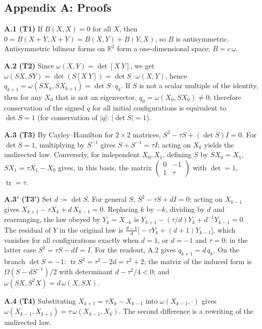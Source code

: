 \documentclass[
  a4paper,
]{article}
\begin{document}
\subsection{Appendix A: Proofs}\label{appendix-a-proofs}

\textbf{A.1 (T1)} If \(B(X,X)=0\) for all \(X\), then
\(0=B(X+Y,X+Y)=B(X,Y)+B(Y,X)\), so \(B\) is antisymmetric. Antisymmetric
bilinear forms on \(\mathbb R^2\) form a one-dimensional space:
\(B=c\,\omega\).

\textbf{A.2 (T2)} Since \(\omega(X,Y)=\det[X\ Y]\), we get
\(\omega(SX,SY)=\det(S[X\ Y])=\det S\cdot\omega(X,Y)\), hence
\(q_{k+1}=\omega(SX_k,SX_{k+1})=\det S\cdot q_k\). If \(S\) is not a
scalar multiple of the identity, then for any \(X_0\) that is not an
eigenvector, \(q_0=\omega(X_0,SX_0)\neq0\); therefore conservation of
the signed \(q\) for all initial configurations is equivalent to
\(\det S=1\) (for conservation of \(\lvert q\rvert\):
\(\lvert\det S\rvert=1\)).

\textbf{A.3 (T3)} By Cayley--Hamilton for \(2\times2\) matrices,
\(S^2-\tau S+(\det S)I=0\). For \(\det S=1\), multiplying by \(S^{-1}\)
gives \(S+S^{-1}=\tau I\); acting on \(X_k\) yields the undirected law.
Conversely, for independent \(X_0,X_1\), defining \(S\) by \(SX_0=X_1\),
\(SX_1=\tau X_1-X_0\) gives, in this basis, the matrix
\(\begin{pmatrix}0&-1\\1&\tau\end{pmatrix}\) with \(\det=1\),
\(\operatorname{tr}=\tau\).

\textbf{A.3' (T3')} Set \(d:=\det S\). For general \(S\),
\(S^2-\tau S+dI=0\); acting on \(X_{k-1}\) gives
\(X_{k+1}-\tau X_k+d\,X_{k-1}=0\). Replacing \(k\) by \(-k\), dividing
by \(d\) and rearranging, the law obeyed by \(Y_k=X_{-k}\) is
\(Y_{k+1}-(\tau/d)Y_k+d^{-1}Y_{k-1}=0\). The residual of \(Y\) in the
original law is \(\frac{d-1}{d}\bigl[-\tau Y_k+(d+1)Y_{k-1}\bigr]\),
which vanishes for all configurations exactly when \(d=1\), or \(d=-1\)
and \(\tau=0\); in the latter case \(S^2=\tau S-dI=I\). For the readout,
A.2 gives \(q_{k+1}=d\,q_k\). On the branch \(\det S=-1\):
\(\operatorname{tr}S^2=\tau^2-2d=\tau^2+2\); the matrix of the induced
form is \(\Omega(S-dS^{-1})/2\) with determinant \(d-\tau^2/4<0\); and
\(\omega(SX,S^2X)=d\,\omega(X,SX)\).

\textbf{A.4 (T4)} Substituting \(X_{k+1}=\tau X_k-X_{k-1}\) into
\(\omega(X_{k-1},\cdot)\) gives
\(\omega(X_{k-1},X_{k+1})=\tau\,\omega(X_{k-1},X_k)\). The second
difference is a rewriting of the undirected law.
\end{document}
